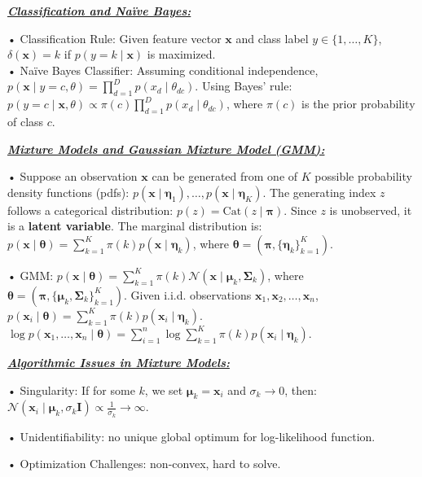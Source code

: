 \documentclass[10pt]{article}
\newcommand{\bulletPoint}[1]{\ul{\textit{\textbf{#1}}}}
\begin{document}
\begin{multicols*}{3}
\bulletPoint{Classification and Naïve Bayes:}\quad

• Classification Rule: Given feature vector $\mathbf{x}$ and class label $y \in \{1, \dots, K\}$,
$\delta(\mathbf{x}) = k$ if $p(y = k \mid \mathbf{x})$ is maximized. \\
• Naïve Bayes Classifier: Assuming conditional independence,
$p(\mathbf{x} \mid y = c, \theta) = \prod_{d=1}^{D} p(x_d \mid \theta_{dc})$. Using Bayes' rule: $p(y = c \mid \mathbf{x}, \theta) \propto \pi(c) \prod_{d=1}^{D} p(x_d \mid \theta_{dc})$, where $\pi(c)$ is the prior probability of class $c$.


\bulletPoint{Mixture Models and Gaussian Mixture Model (GMM):}\quad

• Suppose an observation $\mathbf{x}$ can be generated from one of $K$ possible probability density functions (pdfs):
 $p(\mathbf{x} \mid \boldsymbol{\eta}_1), \dots, p(\mathbf{x} \mid \boldsymbol{\eta}_K)$.
The generating index $z$ follows a categorical distribution: $p(z) = \text{Cat}(z \mid \boldsymbol{\pi})$.
Since $z$ is unobserved, it is a \textbf{latent variable}. The marginal distribution is:
 $p(\mathbf{x} \mid \boldsymbol{\theta}) = \sum_{k=1}^{K} \pi(k) p(\mathbf{x} \mid \boldsymbol{\eta}_k)$,
 where $\boldsymbol{\theta} = (\boldsymbol{\pi}, \{ \boldsymbol{\eta}_k \}_{k=1}^{K})$. 

• GMM: $p(\mathbf{x} \mid \boldsymbol{\theta}) = \sum_{k=1}^{K} \pi(k) \mathcal{N} (\mathbf{x} \mid \boldsymbol{\mu}_k, \boldsymbol{\Sigma}_k)$,
 where $\boldsymbol{\theta} = (\boldsymbol{\pi}, \{ \boldsymbol{\mu}_k, \boldsymbol{\Sigma}_k \}_{k=1}^{K})$. 
Given i.i.d. observations $\mathbf{x}_1, \mathbf{x}_2, \dots, \mathbf{x}_n$, $p(\mathbf{x}_i \mid \boldsymbol{\theta}) = \sum_{k=1}^{K} \pi(k) p(\mathbf{x}_i \mid \boldsymbol{\eta}_k)$.\\
$\log p(\mathbf{x}_1, \dots, \mathbf{x}_n \mid \boldsymbol{\theta}) = \sum_{i=1}^{n} \log \sum_{k=1}^{K} \pi(k) p(\mathbf{x}_i \mid \boldsymbol{\eta}_k)$.

\bulletPoint{Algorithmic Issues in Mixture Models:}\quad

• Singularity:
If for some $k$, we set $\boldsymbol{\mu}_k = \mathbf{x}_i$ and $\sigma_k \to 0$, then:
$\mathcal{N}(\mathbf{x}_i \mid \boldsymbol{\mu}_k, \sigma_k \mathbf{I}) \propto \frac{1}{\sigma_k} \to \infty$. 

• Unidentifiability:
no unique global optimum for log-likelihood function. 

• Optimization Challenges: non-convex, hard to solve. 


\end{multicols*}
\end{document}
